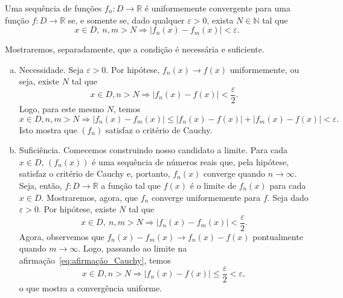 \begin{teo}
  Uma sequência de funções $f_n:D\to\mathbb{R}$ é uniformemente convergente para uma função $f:D\to\mathbb{R}$ se, e somente se, dado qualquer $\varepsilon>0$, exista $N\in\mathbb{N}$ tal que
  \begin{equation}
    x\in D, ~n,m>N \Rightarrow |f_n(x) - f_m(x)| < \varepsilon.
  \end{equation}
\end{teo}
\begin{dem}
  Mostraremos, separadamente, que a condição é necessária e suficiente.
  \begin{enumerate}[a)]
  \item Necessidade. Seja $\varepsilon>0$. Por hipótese, $f_n(x) \to f(x)$ uniformemente, ou seja, existe $N$ tal que
    \begin{equation}
      x\in D, n>N \Rightarrow |f_n(x) - f(x)| < \frac{\varepsilon}{2}.
    \end{equation}
Logo, para este mesmo $N$, temos
\begin{equation}
  x\in D, n,m > N \Rightarrow |f_n(x)-f_m(x)| \leq |f_n(x)-f(x)|+|f_m(x)-f(x)| < \varepsilon.
\end{equation}
Isto mostra que $(f_n)$ satisfaz o critério de Cauchy.
  \item Suficiência. Comecemos construindo nosso candidato a limite. Para cada $x\in D$, $(f_n(x))$ é uma sequência de números reais que, pela hipótese, satisfaz o critério de Cauchy e, portanto, $f_n(x)$ converge quando $n\to \infty$. Seja, então, $f:D\to \mathbb{R}$ a função tal que $f(x)$ é o limite de $f_n(x)$ para cada $x\in D$.
    Mostraremos, agora, que $f_n$ converge uniformemente para $f$. Seja dado $\varepsilon>0$. Por hipótese, existe $N$ tal que
    \begin{equation}\label{eq:afirmação_Cauchy}
      x\in D, ~n,m>N \Rightarrow |f_n(x) - f_m(x)| < \frac{\varepsilon}{2}.
    \end{equation}
Agora, observemos que $f_n(x) - f_m(x) \to f_n(x) - f(x)$ pontualmente quando $m\to \infty$. Logo, passando ao limite na afirmação~\eqref{eq:afirmação_Cauchy}, temos
\begin{equation}
  x\in D, n>N \Rightarrow |f_n(x) - f(x)| \leq \frac{\varepsilon}{2} < \varepsilon,
\end{equation}
o que mostra a convergência uniforme.
  \end{enumerate}
\end{dem}

